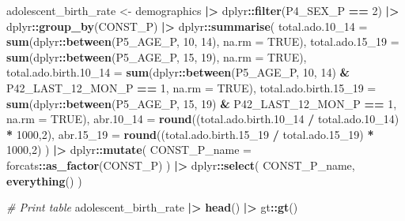 \documentclass[
]{article}
\newenvironment{Shaded}{\begin{snugshade}}{\end{snugshade}}
\newcommand{\AttributeTok}[1]{\textcolor[rgb]{0.13,0.29,0.53}{#1}}
\newcommand{\CommentTok}[1]{\textcolor[rgb]{0.56,0.35,0.01}{\textit{#1}}}
\newcommand{\ConstantTok}[1]{\textcolor[rgb]{0.56,0.35,0.01}{#1}}
\newcommand{\DecValTok}[1]{\textcolor[rgb]{0.00,0.00,0.81}{#1}}
\newcommand{\FloatTok}[1]{\textcolor[rgb]{0.00,0.00,0.81}{#1}}
\newcommand{\FunctionTok}[1]{\textcolor[rgb]{0.13,0.29,0.53}{\textbf{#1}}}
\newcommand{\NormalTok}[1]{#1}
\newcommand{\OtherTok}[1]{\textcolor[rgb]{0.56,0.35,0.01}{#1}}
\newcommand{\SpecialCharTok}[1]{\textcolor[rgb]{0.81,0.36,0.00}{\textbf{#1}}}
\begin{document}
\begin{Shaded}
\begin{Highlighting}[]
\NormalTok{adolescent\_birth\_rate }\OtherTok{\textless{}{-}} 
\NormalTok{  demographics }\SpecialCharTok{|\textgreater{}}
\NormalTok{  dplyr}\SpecialCharTok{::}\FunctionTok{filter}\NormalTok{(P4\_SEX\_P }\SpecialCharTok{==} \DecValTok{2}\NormalTok{) }\SpecialCharTok{|\textgreater{}}
\NormalTok{  dplyr}\SpecialCharTok{::}\FunctionTok{group\_by}\NormalTok{(CONST\_P) }\SpecialCharTok{|\textgreater{}}
\NormalTok{  dplyr}\SpecialCharTok{::}\FunctionTok{summarise}\NormalTok{(}
    \AttributeTok{total.ado.10\_14 =} \FunctionTok{sum}\NormalTok{(dplyr}\SpecialCharTok{::}\FunctionTok{between}\NormalTok{(P5\_AGE\_P, }\DecValTok{10}\NormalTok{, }\DecValTok{14}\NormalTok{), }\AttributeTok{na.rm =} \ConstantTok{TRUE}\NormalTok{),}
    \AttributeTok{total.ado.15\_19 =} \FunctionTok{sum}\NormalTok{(dplyr}\SpecialCharTok{::}\FunctionTok{between}\NormalTok{(P5\_AGE\_P, }\DecValTok{15}\NormalTok{, }\DecValTok{19}\NormalTok{), }\AttributeTok{na.rm =} \ConstantTok{TRUE}\NormalTok{),}
    \AttributeTok{total.ado.birth.10\_14 =} \FunctionTok{sum}\NormalTok{(dplyr}\SpecialCharTok{::}\FunctionTok{between}\NormalTok{(P5\_AGE\_P, }\DecValTok{10}\NormalTok{, }\DecValTok{14}\NormalTok{) }\SpecialCharTok{\&}
\NormalTok{                                  P42\_LAST\_12\_MON\_P }\SpecialCharTok{==} \DecValTok{1}\NormalTok{, }\AttributeTok{na.rm =} \ConstantTok{TRUE}\NormalTok{),}
    \AttributeTok{total.ado.birth.15\_19 =} \FunctionTok{sum}\NormalTok{(dplyr}\SpecialCharTok{::}\FunctionTok{between}\NormalTok{(P5\_AGE\_P, }\DecValTok{15}\NormalTok{, }\DecValTok{19}\NormalTok{) }\SpecialCharTok{\&}
\NormalTok{                                  P42\_LAST\_12\_MON\_P }\SpecialCharTok{==} \DecValTok{1}\NormalTok{, }\AttributeTok{na.rm =} \ConstantTok{TRUE}\NormalTok{),}
    \AttributeTok{abr.10\_14 =} \FunctionTok{round}\NormalTok{((total.ado.birth}\FloatTok{.10}\NormalTok{\_14 }\SpecialCharTok{/}\NormalTok{ total.ado}\FloatTok{.10}\NormalTok{\_14) }\SpecialCharTok{*} \DecValTok{1000}\NormalTok{,}\DecValTok{2}\NormalTok{),}
    \AttributeTok{abr.15\_19 =} \FunctionTok{round}\NormalTok{((total.ado.birth}\FloatTok{.15}\NormalTok{\_19 }\SpecialCharTok{/}\NormalTok{ total.ado}\FloatTok{.15}\NormalTok{\_19) }\SpecialCharTok{*} \DecValTok{1000}\NormalTok{,}\DecValTok{2}\NormalTok{)}
\NormalTok{  ) }\SpecialCharTok{|\textgreater{}}
\NormalTok{  dplyr}\SpecialCharTok{::}\FunctionTok{mutate}\NormalTok{(}
    \AttributeTok{CONST\_P\_name =}\NormalTok{ forcats}\SpecialCharTok{::}\FunctionTok{as\_factor}\NormalTok{(CONST\_P)}
\NormalTok{  ) }\SpecialCharTok{|\textgreater{}}
\NormalTok{  dplyr}\SpecialCharTok{::}\FunctionTok{select}\NormalTok{(}
\NormalTok{    CONST\_P\_name,}
    \FunctionTok{everything}\NormalTok{()}
\NormalTok{  ) }

\CommentTok{\# Print table}
\NormalTok{adolescent\_birth\_rate }\SpecialCharTok{|\textgreater{}}
  \FunctionTok{head}\NormalTok{() }\SpecialCharTok{|\textgreater{}}
\NormalTok{  gt}\SpecialCharTok{::}\FunctionTok{gt}\NormalTok{()}
\end{Highlighting}
\end{Shaded}
\end{document}
